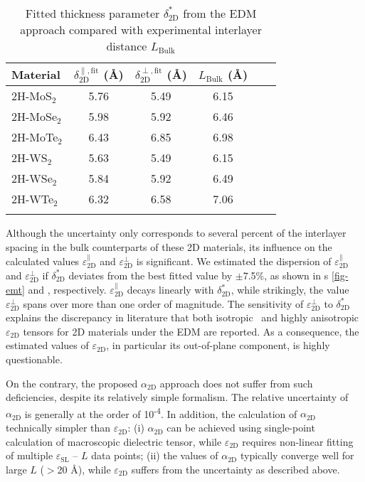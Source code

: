 \begin{table}[!htbp]
  \centering
  \caption{Fitted thickness parameter $\delta_{\mathrm{2D}}^{*}$ from
    the EDM approach compared with experimental interlayer distance
    $L_{\mathrm{Bulk}}$}
  \label{tab:diel-fitting}
  \begin{tabular}[htbp]{lccccc}
  \hline{}
  Material & $\delta_{\mathrm{2D}}^{\parallel, \mathrm{fit}}$ (\AA) & $\delta_{\mathrm{2D}}^{\perp, \mathrm{fit}}$ ({\AA})& $L_{\mathrm{Bulk}}$ ({\AA}) \\
  \hline{}
  2H-MoS$_{2}$ & 5.76 & 5.49 & 6.15 \\
  2H-MoSe$_{2}$ & 5.98 & 5.92 & 6.46\\
  2H-MoTe$_{2}$ & 6.43 & 6.85 & 6.98 \\
  2H-WS$_{2}$ & 5.63 & 5.49 & 6.15 \\
  2H-WSe$_{2}$ & 5.84 & 5.92 & 6.49 \\
  2H-WTe$_{2}$ & 6.32 & 6.58 & 7.06 \\
  \hline{}
  \end{tabular}
\end{table}
% 
%
Although the uncertainty only corresponds to several percent of the
interlayer spacing in the bulk counterparts of these 2D materials, its
influence on the calculated values
$\varepsilon_{\mathrm{2D}}^{\parallel}$ and
$\varepsilon_{\mathrm{2D}}^{\perp}$ is significant. We estimated the
dispersion of $\varepsilon_{\mathrm{2D}}^{\parallel}$ and
$\varepsilon_{\mathrm{2D}}^{\perp}$ if $\delta^{*}_{\mathrm{2D}}$
deviates from the best fitted value by $\pm{}$7.5\%, as shown in
s \autoref{fig-emt} and ,
respectively. $\varepsilon_{\mathrm{2D}}^{\parallel}$ decays linearly
with $\delta^{*}_{\mathrm{2D}}$,
while strikingly, the value $\varepsilon_{\mathrm{2D}}^{\perp}$ spans
over more than one order of magnitude. The sensitivity of
$\varepsilon_{\mathrm{2D}}^{\perp}$ to $\delta^{*}_{\mathrm{2D}}$
explains the discrepancy in literature that both
isotropic~\cite{Sohier_2016_2D_eps} and highly
anisotropic~\cite{Matthes_2016_effective_PRB,Laturia_2018_2D_eps}
$\varepsilon_{\mathrm{2D}}$ tensors for 2D materials under the EDM are
reported. As a consequence, the estimated values of
$\varepsilon_{\mathrm{2D}}$, in particular its out-of-plane component,
is highly questionable.

On the contrary, the proposed $\alpha_{\mathrm{2D}}$ approach does not
suffer from such deficiencies, despite its relatively simple
formalism. The relative uncertainty of $\alpha_{\mathrm{2D}}$ is
generally at the order of 10\textsuperscript{-4}. In addition, the
calculation of $\alpha_{\mathrm{2D}}$ technically simpler than
$\varepsilon_{\mathrm{2D}}$: (i) $\alpha_{\mathrm{2D}}$ can be
achieved using single-point calculation of macroscopic dielectric
tensor, while $\varepsilon_{\mathrm{2D}}$ requires non-linear fitting
of multiple $\varepsilon_{\mathrm{SL}}$ -- $L$ data points; (ii) the
values of $\alpha_{\mathrm{2D}}$ typically converge well for large $L$
($>$20 \AA{}), while $\varepsilon_{\mathrm{2D}}$ suffers from the
uncertainty as described above.

